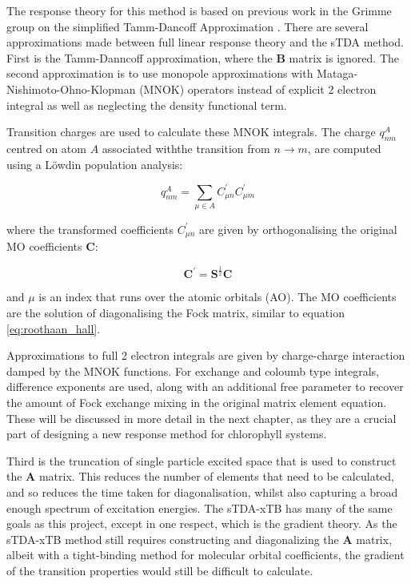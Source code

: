 The response theory for this method is based on previous work in the Grimme 
group on the simplified Tamm-Dancoff Approximation \cite{Grimme2013}.
There are several approximations made between full linear response theory and
the sTDA method. First is the Tamm-Danncoff approximation, where the $\mathbf{B}$
matrix is ignored. The second approximation is to use monopole approximations with
Mataga-Nishimoto-Ohno-Klopman (MNOK) operators instead of explicit 2 electron integral
as well as neglecting the density functional term.

Transition charges are used to calculate these MNOK integrals. The charge $q^A_{nm}$
centred on atom $A$ associated withthe transition from $ n \rightarrow m$, are
computed using a Löwdin population analysis:

\begin{equation}
q_{nm}^A = \sum_{\mu \in A} C^\prime_{\mu n} C^\prime_{\mu m}
\end{equation}

where the transformed coefficients $C^\prime_{\mu n}$ are given by orthogonalising
the original MO coefficients $\textbf{C}$:

\begin{equation}
\textbf{C}^\prime = \textbf{S}^{\frac{1}{2}} \textbf{C}
\end{equation}

and $\mu$ is an index that runs over the atomic orbitals (AO). The MO coefficients
are the solution of diagonalising the Fock matrix, similar to equation \ref{eq:roothaan_hall}.

Approximations to full 2 electron integrals are given by charge-charge interaction
damped by the MNOK\cite{Nishimoto1957}\cite{Ohno1964}\cite{Klopman1964} functions.
For exchange and coloumb type integrals, difference exponents are used, along with
an additional free parameter to recover the amount of Fock exchange mixing in
the original matrix element equation. These will be discussed in more detail in
the next chapter, as they are a crucial part of designing a new response method 
for chlorophyll systems.

Third is the truncation of single particle excited space that is used to construct 
the $\mathbf{A}$ matrix. This reduces the number of elements that need to be 
calculated, and so reduces the time taken for diagonalisation, whilst also capturing 
a broad enough spectrum of excitation energies. The sTDA-xTB has many of the same 
goals as this project, except in one respect, which is the gradient theory. As 
the sTDA-xTB method still requires constructing and diagonalizing the $\mathbf{A}$ 
matrix, albeit with a tight-binding method for molecular orbital coefficients, 
the gradient of the transition properties would still be difficult to calculate.

